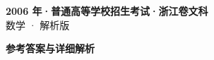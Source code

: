 \documentclass[zihao=-4, a4paper]{ctexart}
\begin{document}
\begin{center}
  {\Large\bfseries 2006 年·普通高等学校招生考试·浙江卷文科}\\[4pt]
  {\large 数学 · 解析版}
\end{center}
\medskip
{}

\clearpage
{}
\begin{center}{\Large\bfseries 参考答案与详细解析}\end{center}
\medskip

\end{document}
